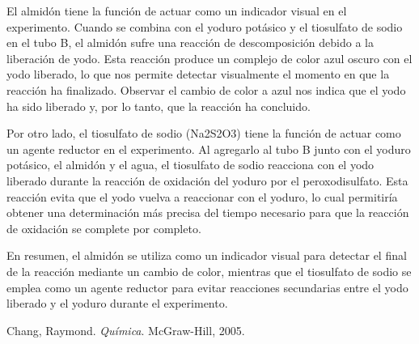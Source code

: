 \documentclass[11pt]{scrartcl}
\begin{document}
El almidón tiene la función de actuar como un indicador visual en el experimento. Cuando se combina con el yoduro potásico y el tiosulfato de sodio en el tubo B, el almidón sufre una reacción de descomposición debido a la liberación de yodo. Esta reacción produce un complejo de color azul oscuro con el yodo liberado, lo que nos permite detectar visualmente el momento en que la reacción ha finalizado. Observar el cambio de color a azul nos indica que el yodo ha sido liberado y, por lo tanto, que la reacción ha concluido.\cite{chang2005quimica}

Por otro lado, el tiosulfato de sodio (Na2S2O3) tiene la función de actuar como un agente reductor en el experimento. Al agregarlo al tubo B junto con el yoduro potásico, el almidón y el agua, el tiosulfato de sodio reacciona con el yodo liberado durante la reacción de oxidación del yoduro por el peroxodisulfato. Esta reacción evita que el yodo vuelva a reaccionar con el yoduro, lo cual permitiría obtener una determinación más precisa del tiempo necesario para que la reacción de oxidación se complete por completo.

En resumen, el almidón se utiliza como un indicador visual para detectar el final de la reacción mediante un cambio de color, mientras que el tiosulfato de sodio se emplea como un agente reductor para evitar reacciones secundarias entre el yodo liberado y el yoduro durante el experimento.

\begin{thebibliography}{99}

Chang, Raymond.
\textit{Química}.
McGraw-Hill, 2005.




\end{thebibliography}
\end{document}

